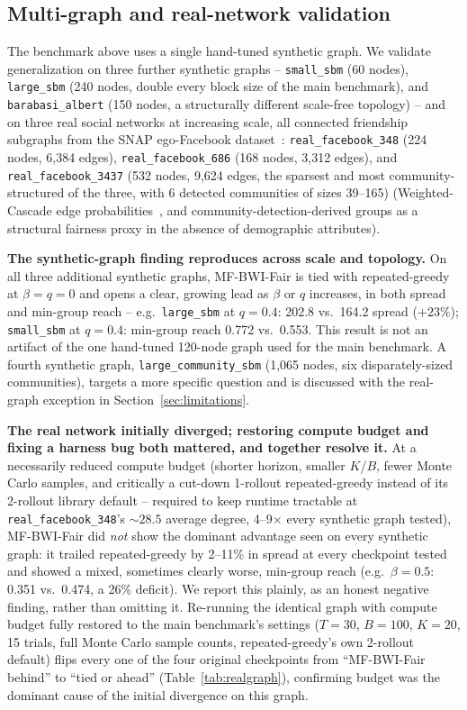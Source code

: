 \documentclass[journal]{IEEEtran}
\begin{document}
\subsection{Multi-graph and real-network validation}
\label{sec:results-multigraph}

The benchmark above uses a single hand-tuned synthetic graph. We validate
generalization on three further synthetic graphs -- \texttt{small\_sbm}
(60 nodes), \texttt{large\_sbm} (240 nodes, double every block size of the
main benchmark), and \texttt{barabasi\_albert} (150 nodes, a structurally
different scale-free topology) -- and on three real social networks at
increasing scale, all connected friendship subgraphs from the SNAP
ego-Facebook dataset~\cite{mcauley2012learning}: \texttt{real\_facebook\_348}
(224 nodes, 6{,}384 edges), \texttt{real\_facebook\_686} (168 nodes,
3{,}312 edges), and \texttt{real\_facebook\_3437} (532 nodes, 9{,}624
edges, the sparsest and most community-structured of the three, with 6
detected communities of sizes 39--165) (Weighted-Cascade edge
probabilities~\cite{chen2009efficient}, and community-detection-derived
groups as a structural fairness proxy in the absence of demographic
attributes).

\textbf{The synthetic-graph finding reproduces across scale and topology.}
On all three additional synthetic graphs, MF-BWI-Fair is tied with
repeated-greedy at $\beta=q=0$ and opens a clear, growing lead as $\beta$
or $q$ increases, in both spread and min-group reach -- e.g.\
\texttt{large\_sbm} at $q=0.4$: 202.8 vs.\ 164.2 spread ($+23\%$);
\texttt{small\_sbm} at $q=0.4$: min-group reach 0.772 vs.\ 0.553. This
result is not an artifact of the one hand-tuned 120-node graph used for
the main benchmark. A fourth synthetic graph, \texttt{large\_community\_sbm}
(1,065 nodes, six disparately-sized communities), targets a more specific
question and is discussed with the real-graph exception in
Section~\ref{sec:limitations}.

\textbf{The real network initially diverged; restoring compute budget and
fixing a harness bug both mattered, and together resolve it.} At a
necessarily reduced compute budget (shorter horizon, smaller $K$/$B$,
fewer Monte Carlo samples, and critically a cut-down 1-rollout
repeated-greedy instead of its 2-rollout library default -- required to
keep runtime tractable at \texttt{real\_facebook\_348}'s $\sim\!28.5$
average degree, 4--9$\times$ every synthetic graph tested), MF-BWI-Fair
did \emph{not} show the dominant advantage seen on every synthetic graph:
it trailed repeated-greedy by 2--11\% in spread at every checkpoint tested
and showed a mixed, sometimes clearly worse, min-group reach (e.g.\
$\beta=0.5$: 0.351 vs.\ 0.474, a 26\% deficit). We report this plainly,
as an honest negative finding, rather than omitting it. Re-running the
identical graph with compute budget fully restored to the main
benchmark's settings ($T=30$, $B=100$, $K=20$, 15 trials, full Monte
Carlo sample counts, repeated-greedy's own 2-rollout default)
flips every one of the four original checkpoints from ``MF-BWI-Fair
behind'' to ``tied or ahead'' (Table~\ref{tab:realgraph}), confirming
budget was the dominant cause of the initial divergence on this graph.
\end{document}
